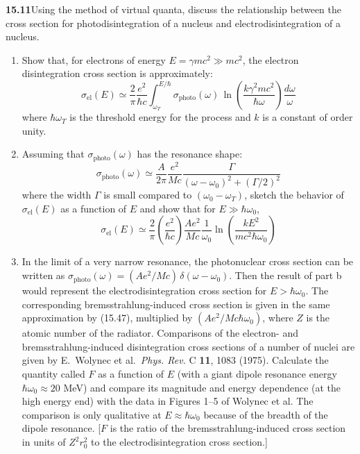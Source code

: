 \par\bigskip
\noindent\textbf{15.11}\quad Using the method of virtual quanta, discuss the relationship between the cross section for photodisintegration of a nucleus and electrodisintegration of a nucleus.
\begin{enumerate}
\item[(a)] Show that, for electrons of energy $E=\gamma mc^{2}\gg mc^{2}$, the electron disintegration cross section is approximately:
\[
\sigma_{\mathrm{el}}(E)\simeq\frac{2}{\pi}\frac{e^{2}}{\hbar c}\int_{\omega_{T}}^{E/\hbar}\sigma_{\mathrm{photo}}(\omega)\,\ln\!\left(\frac{k\gamma^{2}mc^{2}}{\hbar\omega}\right)\!\frac{d\omega}{\omega}
\]
where $\hbar\omega_{T}$ is the threshold energy for the process and $k$ is a constant of order unity.
\item[(b)] Assuming that $\sigma_{\mathrm{photo}}(\omega)$ has the resonance shape:
\[
\sigma_{\mathrm{photo}}(\omega)\simeq\frac{A}{2\pi}\frac{e^{2}}{Mc}\frac{\Gamma}{(\omega-\omega_{0})^{2}+(\Gamma/2)^{2}}
\]
where the width $\Gamma$ is small compared to $(\omega_{0}-\omega_{T})$, sketch the behavior of $\sigma_{\mathrm{el}}(E)$ as a function of $E$ and show that for $E\gg\hbar\omega_{0}$,
\[
\sigma_{\mathrm{el}}(E)\simeq\frac{2}{\pi}\left(\frac{e^{2}}{\hbar c}\right)\!\frac{Ae^{2}}{Mc}\frac{1}{\omega_{0}}\ln\!\left(\frac{kE^{2}}{mc^{2}\hbar\omega_{0}}\right)
\]
\item[(c)] In the limit of a very narrow resonance, the photonuclear cross section can be written as $\sigma_{\mathrm{photo}}(\omega)=(Ae^{2}/Mc)\,\delta(\omega-\omega_{0})$. Then the result of part b would represent the electrodisintegration cross section for $E>\hbar\omega_{0}$. The corresponding bremsstrahlung-induced cross section is given in the same approximation by (15.47), multiplied by $(Ae^{2}/Mc\hbar\omega_{0})$, where $Z$ is the atomic number of the radiator. Comparisons of the electron- and bremsstrahlung-induced disintegration cross sections of a number of nuclei are given by E.~Wolynec et al.\ \emph{Phys. Rev.} C \textbf{11}, 1083 (1975). Calculate the quantity called $F$ as a function of $E$ (with a giant dipole resonance energy $\hbar\omega_{0}\approx20$ MeV) and compare its magnitude and energy dependence (at the high energy end) with the data in Figures 1--5 of Wolynec et al. The comparison is only qualitative at $E\approx\hbar\omega_{0}$ because of the breadth of the dipole resonance. [$F$ is the ratio of the bremsstrahlung-induced cross section in units of $Z^{2}r_{0}^{2}$ to the electrodisintegration cross section.]
\end{enumerate}
\solution

